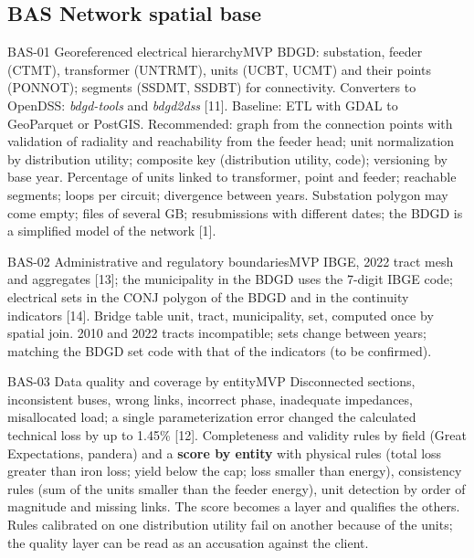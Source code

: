 \subsection{BAS \textperiodcentered{} Network spatial base}

\begin{ficha}{BAS-01 \textperiodcentered{} Georeferenced electrical hierarchy}{MVP}
 BDGD: substation, feeder (CTMT), transformer (UNTRMT),
units (UCBT, UCMT) and their points (PONNOT); segments (SSDMT, SSDBT) for
connectivity. Converters to OpenDSS: \emph{bdgd-tools} and
\emph{bdgd2dss} [11].
 Baseline: ETL with GDAL to GeoParquet or PostGIS.
Recommended: graph from the connection points with validation of radiality and
reachability from the feeder head; unit normalization
by distribution utility; composite key (distribution utility, code); versioning by
base year.
 Percentage of units linked to transformer, point and
feeder; reachable segments; loops per circuit; divergence between
years.
 Substation polygon may come empty; files of several
GB; resubmissions with different dates; the BDGD is a simplified model of the network
[1].
\end{ficha}

\begin{ficha}{BAS-02 \textperiodcentered{} Administrative and regulatory boundaries}{MVP}
 IBGE, 2022 tract mesh and aggregates [13]; the municipality in the
BDGD uses the 7-digit IBGE code; electrical sets in the CONJ polygon of the
BDGD and in the continuity indicators [14].
 Bridge table unit, tract, municipality, set,
computed once by spatial join.
 2010 and 2022 tracts incompatible; sets change
between years; matching the BDGD set code with that of the indicators (to be
confirmed).
\end{ficha}

\begin{ficha}{BAS-03 \textperiodcentered{} Data quality and coverage by entity}{MVP}
 Disconnected sections, inconsistent
buses, wrong links, incorrect phase, inadequate impedances,
misallocated load; a single parameterization error changed the calculated technical
loss by up to 1.45\% [12].
 Completeness and validity rules by field (Great
Expectations, pandera) and a \textbf{score by entity} with physical rules
(total loss greater than iron loss; yield below the cap; loss
smaller than energy), consistency rules (sum of the units smaller than the feeder
energy), unit detection by order of magnitude and missing links.
The score becomes a layer and qualifies the others.
 Rules calibrated on one distribution utility fail on another because
of the units; the quality layer can be read as an accusation against the
client.
\end{ficha}

